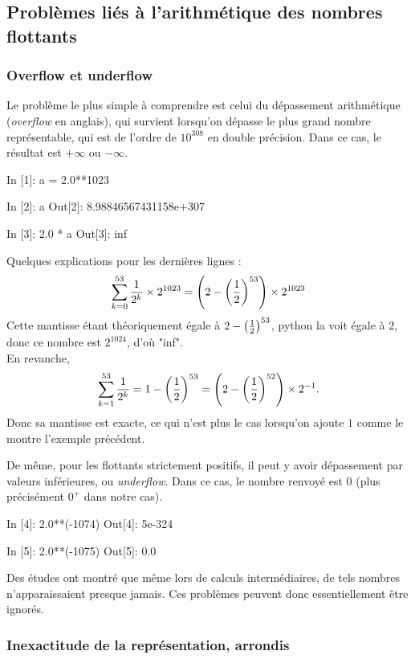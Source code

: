 \documentclass{magnoliaold}
\begin{document}
    
  

\subsection{Problèmes liés à l'arithmétique des nombres flottants}

\subsubsection{Overflow et underflow}
Le problème le plus simple à comprendre est celui du dépassement arithmétique (\emph{overflow} en anglais), qui
survient lorsqu'on dépasse le plus grand nombre représentable, qui est de l'ordre
de $10^{308}$ en double précision. Dans ce cas, le résultat est
$+\infty$ ou $-\infty$.

\begin{pythoncode}
In [1]: a = 2.0**1023

In [2]: a
Out[2]: 8.98846567431158e+307

In [3]: 2.0 * a
Out[3]: inf
\end{pythoncode}

\begin{sol}
Quelques explications pour les dernières lignes :
$$\sum_{k=0}^{53}\frac{1}{2^k}\times 2^{1023}=\left(2-\left(\frac{1}{2}\right)^{53}\right)\times 2^{1023}$$ Cette mantisse étant théoriquement égale à $2-\left(\frac{1}{2}\right)^{53}$, python la voit égale à $2$, donc ce nombre est $2^{1024}$, d'où "inf".\\
En revanche, 
$$\sum_{k=1}^{53}\frac{1}{2^k}=1-\left(\frac{1}{2}\right)^{53}=\left(2-\left(\frac{1}{2}\right)^{52}\right)\times 2^{-1}.$$ Donc sa mantisse est exacte, ce qui n'est plus le cas lorsqu'on ajoute $1$ comme le montre l'exemple précédent.
\end{sol}

\noindent
De même, pour les flottants strictement positifs, il peut y avoir dépassement par valeurs inférieures, ou \textit{underflow}. Dans
ce cas, le nombre renvoyé est 0 (plus précisément $0^+$ dans notre cas).

\begin{pythoncode}
In [4]: 2.0**(-1074)
Out[4]: 5e-324

In [5]: 2.0**(-1075)
Out[5]: 0.0
\end{pythoncode}
\noindent
Des études ont montré que même lors de calculs intermédiaires, de tels nombres
n'apparaissaient presque jamais. Ces problèmes peuvent donc essentiellement être ignorés.

\subsubsection{Inexactitude de la représentation, arrondis}
\end{document}
